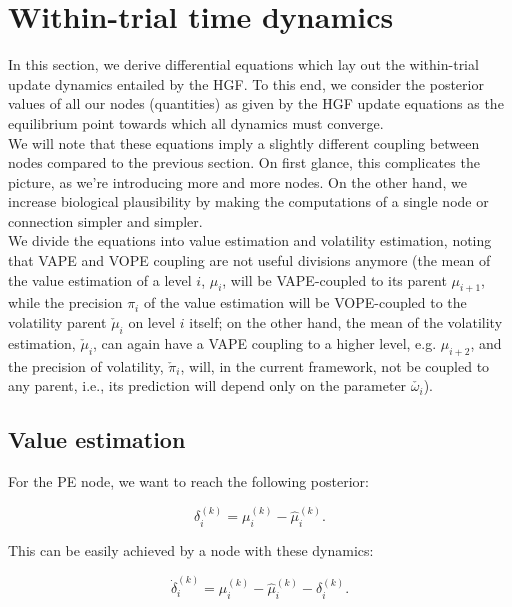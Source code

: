 \section{Within-trial time dynamics}

In this section, we derive differential equations which lay out the within-trial update dynamics entailed by the HGF. To this end, we consider the posterior values of all our nodes (quantities) as given by the HGF update equations as the equilibrium point towards which all dynamics must converge. \\

We will note that these equations imply a slightly different coupling between nodes compared to the previous section. On first glance, this complicates the picture, as we're introducing more and more nodes. On the other hand, we increase biological plausibility by making the computations of a single node or connection simpler and simpler.\\

We divide the equations into \textsf{value} estimation and \textsf{volatility} estimation, noting that \textsf{VAPE} and \textsf{VOPE} coupling are not useful divisions anymore (the mean of the value estimation of a level $i$, $\mu_i$, will be \textsf{VAPE}-coupled to its parent $\mu_{i+1}$, while the precision $\pi_i$ of the value estimation will be \textsf{VOPE}-coupled to the volatility parent $\check{\mu}_i$ on level $i$ itself; on the other hand, the mean of the volatility estimation, $\check{\mu}_i$, can again have a \textsf{VAPE} coupling to a higher level, e.g. $\mu_{i+2}$, and the precision of volatility, $\check{\pi}_i$, will, in the current framework, not be coupled to any parent, i.e., its prediction will depend only on the parameter $\check{\omega_i}$).

\subsection{Value estimation}

For the \textsf{PE} node, we want to reach the following posterior:

\begin{equation}
	\delta_i^{(k)} = \mu_i^{(k)} - \hat{\mu}_i^{(k)}.
\end{equation}

This can be easily achieved by a node with these dynamics:

\begin{equation}
	\dot{\delta}_i^{(k)} = \mu_i^{(k)} - \hat{\mu}_i^{(k)} - \delta_i^{(k)}.
\end{equation}

